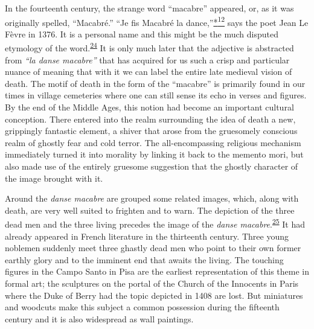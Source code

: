In the fourteenth century, the strange word ``macabre'' appeared, or, as
it was originally spelled, ``Macabré.'' ``Je fis Macabré la
dance,''\protect\hypertarget{12_Chapter_Five__THE_VISION_OF_DEAT.xhtmlux5cux23id_2973}{\protect\hyperlink{23_NOTES.xhtmlux5cux23id_2974}{*\textsuperscript{12}}}
says the poet Jean Le Fèvre in 1376. It is a personal name and this
might be the much disputed etymology of the
word.\textsuperscript{\protect\hypertarget{12_Chapter_Five__THE_VISION_OF_DEAT.xhtmlux5cux23id_1304}{\protect\hyperlink{23_NOTES.xhtmlux5cux23id_1305}{24}}}
It is only much later that the adjective is abstracted from \emph{``la
danse macabre''} that has acquired for us such a crisp and particular
nuance of meaning that with it we can label the entire late medieval
vision of death. The motif of death in the form of the ``macabre'' is
primarily found in our times in village cemeteries where one can still
sense its echo in verses and figures. By the end of the Middle Ages,
this notion had become an important cultural conception. There entered
into the realm surrounding the idea of death a new, grippingly fantastic
element, a shiver that arose from the gruesomely conscious realm of
ghostly fear and cold terror. The all-encompassing religious mechanism
immediately turned it into morality by linking it back to the memento
mori, but also made use of the entirely gruesome suggestion that the
ghostly character of the image brought with it.

Around the \emph{danse macabre} are grouped some related images, which,
along with death, are very well suited to frighten and to warn. The
depiction of the three dead men and the three living precedes the image
of the \emph{danse
macabre}.\textsuperscript{\protect\hypertarget{12_Chapter_Five__THE_VISION_OF_DEAT.xhtmlux5cux23id_1302}{\protect\hyperlink{23_NOTES.xhtmlux5cux23id_1303}{25}}}
It had already appeared in French literature in the thirteenth century.
Three young noblemen suddenly meet three ghastly dead men who point to
their own former earthly glory and to the imminent end that awaits the
living. The touching figures in the Campo Santo in Pisa are the earliest
representation of this theme in formal art; the sculptures on the portal
of the Church of the Innocents in Paris where the Duke of Berry had the
topic depicted in 1408 are lost. But miniatures and
\protect\hypertarget{12_Chapter_Five__THE_VISION_OF_DEAT.xhtmlux5cux23page_165}{}{}woodcuts
make this subject a common possession during the fifteenth century and
it is also widespread as wall paintings.

